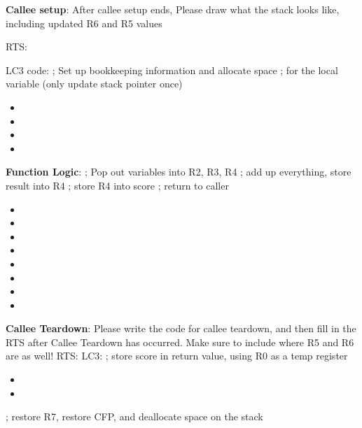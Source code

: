 \documentclass{article}
\begin{document}
\begin{enumerate}[label=(\alph*), itemsep = 120pt]
  \textbf{Callee setup}: After callee setup ends, Please draw what the stack looks like, including updated R6 and R5 values 
  
RTS:
 \newline
 \newline
 \newline
 \newline
 \newline
 \newline
 \newline
 \newline
 \newline
 \newline
 
 LC3 code:
  \newline
; Set up bookkeeping information and allocate space
\newline
; for the local variable (only update stack pointer once) 
 \begin{itemize}
    \item  
    \item   
    \item   
    \item     
\end{itemize}



\textbf{Function Logic}:
\newline
; Pop out variables into R2, R3, R4
\newline
; add up everything, store result into R4
\newline
; store R4 into score
\newline
; return to caller
 \begin{itemize}
    \item 
    \item 
    \item 
    \item 
    \item 
    \item 
    \item 
    \item 
    
    
\end{itemize}

\textbf{Callee Teardown}: Please write the code for callee teardown, and then fill in the RTS after Callee Teardown has occurred. Make sure to include where R5 and R6 are as well!
RTS:
\newline
\newline
\newline
\newline
\newline
\newline
\newpage
LC3:
\newline
; store score in return value, using R0 as a temp register
\begin{itemize}
    \item 
    \item 
\end{itemize}
\newline
; restore R7, restore CFP, and deallocate space on the stack


\end{enumerate}
\end{document}
